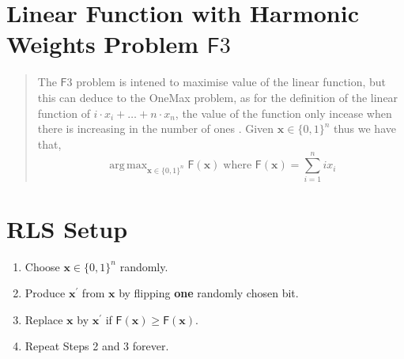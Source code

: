 \documentclass[a4paper, 12pt]{article}
\DeclareMathOperator*{\argmax}{arg\,max}
\begin{document}
\section*{Linear Function with Harmonic Weights Problem $\mathsf{F}3$}
    \begin{quote}
        The $\mathsf{F}3$ problem is intened to maximise value of the linear function, but this can deduce to the OneMax problem, as for the definition
        of the linear function of $i\cdot x_i + \ldots + n\cdot x_n$, the value of the function only incease when there is increasing in the number of ones
        . Given $\mathbf{x}\in\{0,1\}^n$ thus we have that,
        \begin{equation*}
            \argmax_{\mathbf{x}\in\{0,1\}^n}\mathsf{F}(\mathbf{x})\;\text{where } \mathsf{F}(\mathbf{x}) = \sum_{i = 1}^{n}ix_i
        \end{equation*}
    \end{quote}
\section*{RLS Setup}
\begin{tcolorbox}[title={RLS}, colback=black!10, colframe=black!70, fonttitle=\bfseries]
    \begin{enumerate}
        \item Choose $\mathbf{x} \in \{0,1\}^n$ randomly.
        \item Produce $\mathbf{x}^\prime$ from $\mathbf{x}$ by flipping \textbf{one} randomly chosen bit.
        \item Replace $\mathbf{x}$ by $\mathbf{x}^\prime$ if $\mathsf{F}(\mathbf{x}) \geq \mathsf{F}(\mathbf{x})$.
        \item Repeat Steps 2 and 3 forever.
    \end{enumerate}
\end{tcolorbox}
\end{document}
